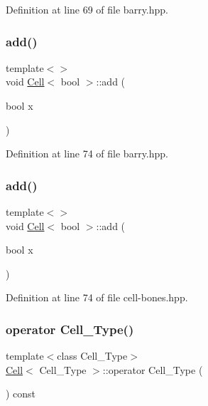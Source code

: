 Definition at line 69 of file barry.\+hpp.

\mbox{\label{class_cell_a0da6d3d39069cc22486442cc51c7685c}} 
\subsubsection{\texorpdfstring{add()}{add()}\hspace{0.1cm}{\footnotesize\ttfamily [8/9]}}
{\footnotesize\ttfamily template$<$$>$ \\
void \hyperlink{class_cell}{Cell}$<$ bool $>$\+::add (\begin{DoxyParamCaption}\item[{bool}]{x }\end{DoxyParamCaption})\hspace{0.3cm}{\ttfamily [inline]}}



Definition at line 74 of file barry.\+hpp.

\mbox{\label{class_cell_a0da6d3d39069cc22486442cc51c7685c}} 
\subsubsection{\texorpdfstring{add()}{add()}\hspace{0.1cm}{\footnotesize\ttfamily [9/9]}}
{\footnotesize\ttfamily template$<$$>$ \\
void \hyperlink{class_cell}{Cell}$<$ bool $>$\+::add (\begin{DoxyParamCaption}\item[{bool}]{x }\end{DoxyParamCaption})\hspace{0.3cm}{\ttfamily [inline]}}



Definition at line 74 of file cell-\/bones.\+hpp.

\mbox{\label{class_cell_abe9b289bc80d4f5d0717ba9e69197c0b}} 
\subsubsection{\texorpdfstring{operator Cell\+\_\+\+Type()}{operator Cell\_Type()}}
{\footnotesize\ttfamily template$<$class Cell\+\_\+\+Type$>$ \\
\hyperlink{class_cell}{Cell}$<$ Cell\+\_\+\+Type $>$\+::operator Cell\+\_\+\+Type (\begin{DoxyParamCaption}{ }\end{DoxyParamCaption}) const\hspace{0.3cm}{\ttfamily [inline]}}




